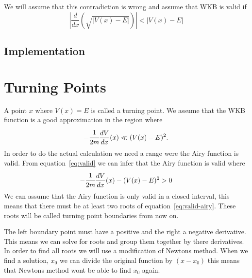 \documentclass[11pt,DIV=10,final]{scrreprt} %
\newcommand{\deriv}[2]{%
  \frac{d#1}{d#2}
}
\begin{document}
We will assume that this contradiction is wrong and assume that WKB is valid if
\[
  \left|\frac{d}{dx}(\sqrt{|V(x) - E|})\right| < |V(x) - E|
\]

\subsection{Implementation}

\section{Turning Points}
A point $x$ where $V(x) = E$ is called a turning point. We assume that the WKB function is a good approximation in the region where
\begin{align}
  \label{eq:valid}
  -\cfrac{1}{2m} \deriv{V}{x}(x) \ll (V(x) - E)^{2}.
\end{align}
In order to do the actual calculation we need a range were the Airy function is valid.
From equation~\ref{eq:valid} we can infer that the Airy function is valid where
\begin{align}
  \label{eq:valid-airy}
  -\cfrac{1}{2m} \deriv{V}{x}(x) - (V(x) - E)^{2} > 0
\end{align}
We can assume that the Airy function is only valid in a closed interval, this means that there must be at least two roots of equation~\ref{eq:valid-airy}. These roots will be called turning point boundaries from now on.

The left boundary point must have a positive and the right a negative derivative. This means we can solve for roots and group them together by there derivatives.
\\
In order to find all roots we will use a modification of Newtons method. When we find a solution, $x_{0}$ we can divide the original function by $(x - x_{0})$ this means that Newtons method wont be able to find $x_{0}$ again.
\end{document}

